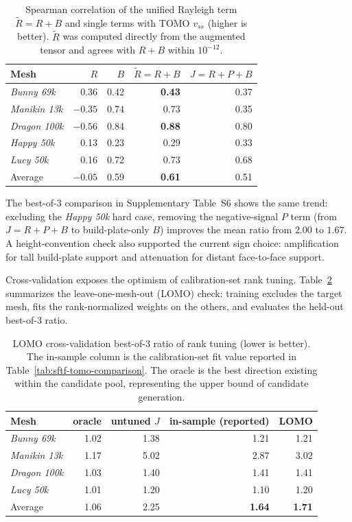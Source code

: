 \documentclass[11pt,a4paper]{article}
\begin{document}
\begin{table}[H]
\centering
\caption{Spearman correlation of the unified Rayleigh term $\tilde R=R+B$ and single terms with TOMO $v_{ss}$ (higher is better).
$\tilde R$ was computed directly from the augmented tensor and agrees with $R+B$ within $10^{-12}$.}
\label{tab:unified-corr}
\begin{tabular}{lrrrr}
\toprule
Mesh & $R$ & $B$ & $\tilde R=R{+}B$ & $J=R{+}P{+}B$\\
\midrule
\emph{Bunny 69k}   & 0.36 & 0.42 & \textbf{0.43} & 0.37\\
\emph{Manikin 13k} & $-0.35$ & 0.74 & 0.73 & 0.35\\
\emph{Dragon 100k}  & $-0.56$ & 0.84 & \textbf{0.88} & 0.80\\
\emph{Happy 50k}   & 0.13 & 0.23 & 0.29 & 0.33\\
\emph{Lucy 50k}    & 0.16 & 0.72 & 0.73 & 0.68\\
\midrule
Average    & $-0.05$ & 0.59 & \textbf{0.61} & 0.51\\
\bottomrule
\end{tabular}
\end{table}

The best-of-3 comparison in Supplementary Table~S6 shows the same trend: excluding the \emph{Happy 50k} hard case, removing the negative-signal $P$ term (from $J{=}R{+}P{+}B$ to build-plate-only $B$) improves the mean ratio from $2.00$ to $1.67$. A height-convention check also supported the current sign choice: amplification for tall build-plate support and attenuation for distant face-to-face support.

Cross-validation exposes the optimism of calibration-set rank tuning. Table~\ref{tab:lomo-cv} summarizes the leave-one-mesh-out (LOMO) check: training excludes the target mesh, fits the rank-normalized weights on the others, and evaluates the held-out best-of-3 ratio.

\begin{table}[H]
\centering
\caption{LOMO cross-validation best-of-3 ratio of rank tuning (lower is better).
The in-sample column is the calibration-set fit value reported in Table~\ref{tab:sftf-tomo-comparison}.
The oracle is the best direction existing within the candidate pool, representing the upper bound of candidate generation.}
\label{tab:lomo-cv}
\begin{tabular}{lrrrr}
\toprule
Mesh & oracle & untuned $J$ & in-sample (reported) & LOMO\\
\midrule
\emph{Bunny 69k}    & 1.02 & 1.38 & 1.21 & 1.21\\
\emph{Manikin 13k}  & 1.17 & 5.02 & 2.87 & 3.02\\
\emph{Dragon 100k}   & 1.03 & 1.40 & 1.41 & 1.41\\
\emph{Lucy 50k}     & 1.01 & 1.20 & 1.10 & 1.20\\
\midrule
Average     & 1.06 & 2.25 & \textbf{1.64} & \textbf{1.71}\\
\bottomrule
\end{tabular}
\end{table}
\end{document}
